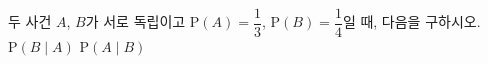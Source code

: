 두 사건 $A$, $B$가 서로 독립이고 $\mathrm{P}(A)=\dfrac{1}{3}$, $\mathrm{P}(B)=\dfrac{1}{4}$일 때, 다음을 구하시오.
 $\mathrm{P}(B\mid A)$
 $\mathrm{P}(A\mid B)$
